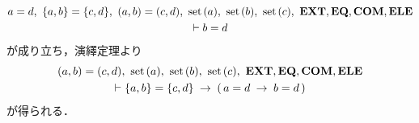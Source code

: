 \begin{sketch}
\begin{description}
				\begin{align}
					\begin{gathered}
						a = d,\ \{a,b\} = \{c,d\},\ (a,b) = (c,d),\ \set{a},\ \set{b},\ \set{c},\ \EXTAX,\EQAX,\COMAX,\ELEAX \\
						\vdash b = d
					\end{gathered}
				\end{align}
				が成り立ち，演繹定理より
				\begin{align}
					\begin{gathered}
						(a,b) = (c,d),\ \set{a},\ \set{b},\ \set{c},\ \EXTAX,\EQAX,\COMAX,\ELEAX \\
						\vdash \{a,b\} = \{c,d\} \rarrow (\, a = d \rarrow b = d\, )
					\end{gathered}
					\label{fom:equality_of_ordered_pairs_12}
				\end{align}
				が得られる．
				

\end{description}
\end{sketch}
